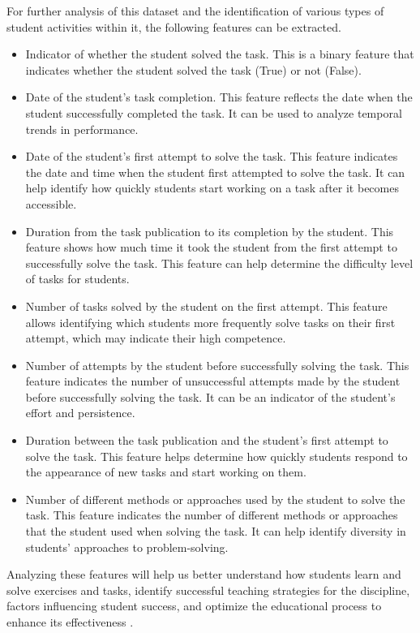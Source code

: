 \documentclass{article}
\begin{document}
\begin{multicols}{2}
\begin{justify}
      For further analysis of this dataset and the identification of various types of student activities within it, the following features can be extracted.

      \begin{itemize}
        \item	Indicator of whether the student solved the task. This is a binary feature that indicates whether the student solved the task (True) or not (False).
        \item	Date of the student's task completion. This feature reflects the date when the student successfully completed the task. It can be used to analyze temporal trends in performance.
        \item	Date of the student's first attempt to solve the task. This feature indicates the date and time when the student first attempted to solve the task. It can help identify how quickly students start working on a task after it becomes accessible.
        \item	Duration from the task publication to its completion by the student. This feature shows how much time it took the student from the first attempt to successfully solve the task. This feature can help determine the difficulty level of tasks for students.
        \item	Number of tasks solved by the student on the first attempt. This feature allows identifying which students more frequently solve tasks on their first attempt, which may indicate their high competence.
        \item	Number of attempts by the student before successfully solving the task. This feature indicates the number of unsuccessful attempts made by the student before successfully solving the task. It can be an indicator of the student's effort and persistence.
        \item	Duration between the task publication and the student's first attempt to solve the task. This feature helps determine how quickly students respond to the appearance of new tasks and start working on them.
        \item	Number of different methods or approaches used by the student to solve the task. This feature indicates the number of different methods or approaches that the student used when solving the task. It can help identify diversity in students' approaches to problem-solving. 
      \end{itemize}

      Analyzing these features will help us better understand how students learn and solve exercises and tasks, identify successful teaching strategies for the discipline, factors influencing student success, and optimize the educational process to enhance its effectiveness \cite{13}.


\end{justify}
\end{multicols}
\end{document}
